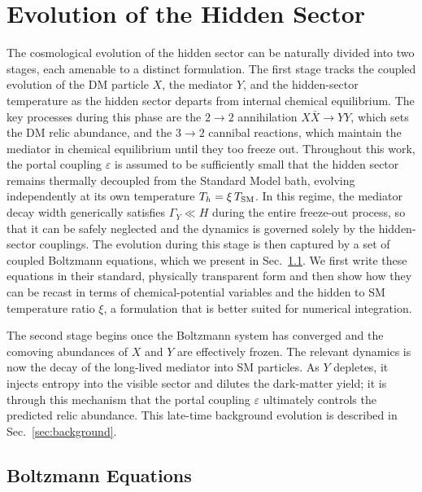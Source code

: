\documentclass[11pt]{article}
\numberwithin{equation}{section}
\begin{document}
\section{Evolution of the Hidden Sector}\label{sec:evolution}
The cosmological evolution of the hidden sector can be naturally divided into two stages, each amenable to a distinct formulation.
The first stage tracks the coupled evolution of the DM particle $X$, the mediator $Y$, and the hidden-sector temperature as the hidden sector departs from internal chemical equilibrium. The key processes during this phase are the $2\to2$ annihilation $X\bar{X}\to YY$, which sets the DM relic abundance, and the $3\to2$ cannibal reactions, which maintain the mediator in chemical equilibrium until they too freeze out. Throughout this work, the portal coupling $\varepsilon$ is assumed to be sufficiently small that the hidden sector remains thermally decoupled from the Standard Model bath, evolving independently at its own temperature $T_h = \xi\,T_{\rm SM}$. In this regime, the mediator decay width generically satisfies $\Gamma_Y \ll H$ during the entire freeze-out process, so that it can be safely neglected and the dynamics is governed solely by the hidden-sector couplings. The evolution during this stage is then captured by a set of coupled Boltzmann equations, which we present in Sec.~\ref{sec:boltzmann}. We first write these equations in their standard, physically transparent form and then show how they can be recast in terms of chemical-potential variables and the hidden to SM temperature ratio $\xi$, a formulation that is better suited for numerical integration.

The second stage begins once the Boltzmann system has converged and the comoving abundances of $X$ and $Y$ are effectively frozen. The relevant dynamics is now the decay of the long-lived mediator into SM particles. As $Y$ depletes, it injects entropy into the visible sector and dilutes the dark-matter yield; it is through this mechanism that the portal coupling $\varepsilon$ ultimately controls the predicted relic abundance. This late-time background evolution is described in Sec.~\ref{sec:background}.

\subsection{Boltzmann Equations}
\label{sec:boltzmann}
\end{document}
